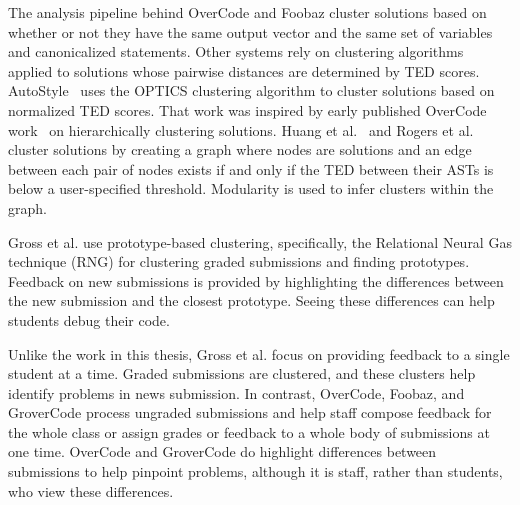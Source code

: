 The analysis pipeline behind OverCode and Foobaz cluster solutions based on whether or not they have the same output vector and the same set of variables and canonicalized statements. Other systems rely on clustering algorithms applied to solutions whose pairwise distances are determined by TED scores. AutoStyle~\cite{choudhury2016autostyle} uses the OPTICS clustering algorithm to cluster solutions based on normalized TED scores. That work was inspired by early published OverCode work~\cite{glassman2014feature} on hierarchically clustering solutions. Huang et al.~\cite{MOOCshop} and Rogers et al.~\cite{ACESthesis} cluster solutions by creating a graph where nodes are solutions and an edge between each pair of nodes exists if and only if the TED between their ASTs is below a user-specified threshold. Modularity is used to infer clusters within the graph. 

Gross et al. \cite{gross} use prototype-based clustering, specifically, the Relational Neural Gas technique (RNG) for clustering graded submissions and finding prototypes. Feedback on new submissions is provided by highlighting the differences between the new submission and the closest prototype. Seeing these differences can help students debug their code. 

Unlike the work in this thesis, Gross et al. focus on providing feedback to a single student at a time. Graded submissions are clustered, and these clusters help identify problems in news submission. In contrast, OverCode, Foobaz, and GroverCode process ungraded submissions and help staff compose feedback for the whole class or assign grades or feedback to a whole body of submissions at one time. OverCode and GroverCode do highlight differences between submissions to help pinpoint problems, although it is staff, rather than students, who view these differences.

